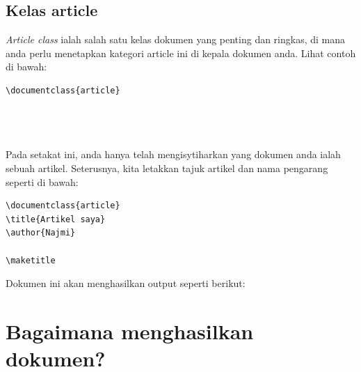 \subsection{Kelas article}
\emph{Article class} ialah salah satu kelas dokumen yang penting dan ringkas, di mana anda perlu menetapkan kategori article ini di kepala dokumen anda.
Lihat contoh di bawah:\\

\begin{lstlisting}[frame=shadowbox]
\documentclass{article}




\end{lstlisting}

Pada setakat ini, anda hanya telah mengisytiharkan yang dokumen anda ialah sebuah artikel. Seterusnya, kita letakkan tajuk artikel dan nama pengarang
seperti di bawah:\\

\begin{lstlisting}[frame=shadowbox]
\documentclass{article}
\title{Artikel saya}
\author{Najmi}

\maketitle

\end{lstlisting}

\bigskip
Dokumen ini akan menghasilkan output seperti berikut:\\

\begin{minipage}{\linewidth}
\centering
{}
\label{artikel}
\end{minipage}

\section{Bagaimana \latex{} menghasilkan dokumen?}

